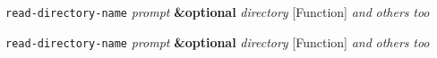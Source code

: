 \documentclass[12pt,onecolumn]{article}
\begin{document}
\blindtext

\noindent
  \texttt{read-directory-name} \emph{prompt} \textbf {\&optional} \emph{directory}
  \hfill [Function]
\hspace*{19ex} \emph{and} \emph{others} \emph{too}
\begin{doc-string}
\blindtext

\blindtext
\end{doc-string}


\noindent
  \texttt{read-directory-name} \emph{prompt} \textbf {\&optional} \emph{directory}
  \hfill [Function]
\hspace*{22ex} \emph{and} \emph{others} \emph{too}
\begin{doc-string}
\blindtext
\end{doc-string}

\blindtext

\printindex
\end{document}
